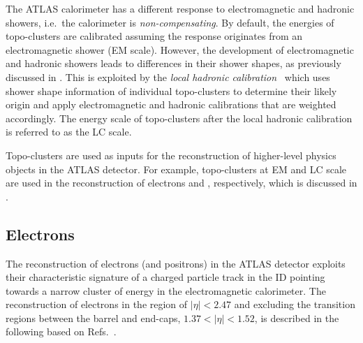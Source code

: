The ATLAS calorimeter has a different response to electromagnetic and hadronic
showers, i.e.\ the calorimeter is \emph{non-compensating}. By default, the
energies of topo-clusters are calibrated assuming the response originates from
an electromagnetic shower (EM scale). However, the development of
electromagnetic and hadronic showers leads to differences in their shower
shapes, as previously discussed in . This is
exploited by the \emph{local hadronic calibration}~\cite{PERF-2014-07} which
uses shower shape information of individual topo-clusters to determine their
likely origin and apply electromagnetic and hadronic calibrations that are
weighted accordingly. The energy scale of topo-clusters after the local hadronic
calibration is referred to as the LC scale.

Topo-clusters are used as inputs for the reconstruction of higher-level physics
objects in the ATLAS detector. For example, topo-clusters at EM and LC scale are
used in the reconstruction of electrons and \tauhadvis, respectively, which is
discussed in .


\subsection{Electrons}%
\label{sec:ele_rec}

The reconstruction of electrons (and positrons) in the ATLAS detector exploits
their characteristic signature of a charged particle track in the ID pointing
towards a narrow cluster of energy in the electromagnetic calorimeter. The
reconstruction of electrons in the region of $|\eta| < 2.47$ and excluding the
transition regions between the barrel and end-caps, $1.37 < |\eta| < 1.52$, is
described in the following based on
Refs.~\cite{ATL-PHYS-PUB-2017-022,EGAM-2018-01}.

